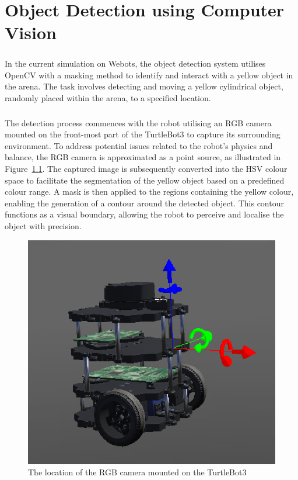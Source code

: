 \chapter{Object Detection using Computer Vision}

\paragraph*{}
In the current simulation on Webots, the object detection system utilises OpenCV with a masking method to identify and interact with a yellow object in the arena. The task involves detecting and moving a yellow cylindrical object, randomly placed within the arena, to a specified location.

\paragraph*{}
The detection process commences with the robot utilising an RGB camera mounted on the front-most part of the TurtleBot3 to capture its surrounding environment. To address potential issues related to the robot's physics and balance, the RGB camera is approximated as a point source, as illustrated in Figure~\ref{fig:object detection figure 1}. The captured image is subsequently converted into the HSV colour space to facilitate the segmentation of the yellow object based on a predefined colour range. A mask is then applied to the regions containing the yellow colour, enabling the generation of a contour around the detected object. This contour functions as a visual boundary, allowing the robot to perceive and localise the object with precision.

\begin{figure}[H]
    \centering
    \includegraphics[width=0.5\linewidth]{assets/images/object_detection/fig1.png}
    \caption{The location of the RGB camera mounted on the TurtleBot3}
    \label{fig:object detection figure 1} 
\end{figure}

